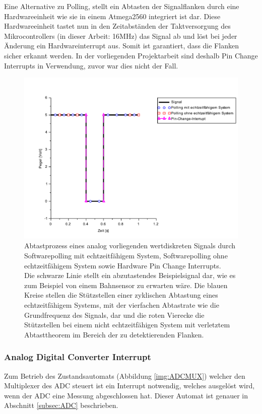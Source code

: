 \documentclass[a4paper, 11pt]{report}
\begin{document}
\newpage
					Eine Alternative zu Polling, stellt ein Abtasten der Signalflanken durch eine Hardwareeinheit wie sie in einem Atmega2560 integriert ist dar.
					Diese Hardwareeinheit tastet nun in den Zeitabständen der Taktversorgung des Mikrocontrollers (in dieser Arbeit: 16MHz) das Signal ab 
					und löst bei jeder Änderung ein Hardwareinterrupt aus. 
					Somit ist garantiert, dass die Flanken sicher erkannt werden. 
					In der vorliegenden Projektarbeit sind deshalb Pin Change Interrupts in Verwendung, zuvor war dies nicht der Fall.  
				\begin{figure}[ht]
					\centering
					\includegraphics[width=\textwidth]{rec/rtPolling.pdf}
					\caption[Abtastung eines digitalen Signals]{Abtastprozess eines analog vorliegenden wertdiskreten Signals durch Softwarepolling mit echtzeitfähigem System, 
 					Softwarepolling ohne echtzeitfähigem System sowie Hardware Pin Change Interrupts.\\
					Die schwarze Linie stellt ein abzutastendes Beispielsignal dar, wie es zum Beispiel von einem Bahnsensor zu erwarten wäre.
					Die blauen Kreise stellen die Stützstellen einer zyklischen Abtastung eines echtzeitfähigem Systems, 
					mit der vierfachen Abtastrate wie die Grundfrequenz des Signals, 
					dar und die roten Vierecke die Stützstellen bei einem nicht echtzeitfähigen System mit verletztem Abtasttheorem im Bereich der zu detektierenden Flanken.
					 }
				\label{fig:rtPolling}
				\end{figure}
\FloatBarrier
			\subsubsection{Analog Digital Converter Interrupt}\label{subsubsec:ADCINT}
			Zum Betrieb des Zustandsautomats (Abbildung \ref{img:ADCMUX}) welcher den Multiplexer des ADC steuert ist ein Interrupt notwendig, welches ausgelöst wird, wenn der ADC eine Messung abgeschlossen hat. Dieser Automat ist genauer in Abschnitt \ref{subsec:ADC} beschrieben.
\end{document}
